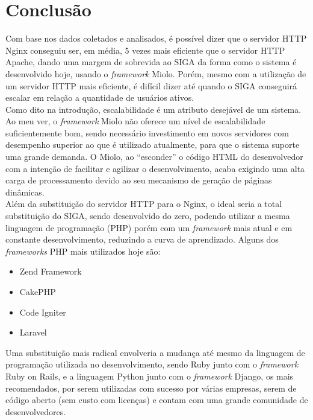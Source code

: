 \chapter{Conclusão}\label{cap:conclusao}
Com base nos dados coletados e analisados, é possível dizer que o servidor HTTP 
Nginx conseguiu ser, em média, 5 vezes mais eficiente que o servidor HTTP 
Apache, dando uma margem de sobrevida ao SIGA da forma como o sistema é 
desenvolvido hoje, usando o \textit{framework} Miolo. Porém, mesmo com a 
utilização de um servidor HTTP mais eficiente, é difícil dizer até quando o 
SIGA conseguirá escalar em relação a quantidade de usuários ativos.\\
Como dito na introdução, escalabilidade é um atributo desejável de um sistema. 
Ao meu ver, o \textit{framework} Miolo não oferece um nível de escalabilidade 
suficientemente bom, sendo necessário investimento em novos servidores com 
desempenho superior ao que é utilizado atualmente, para que o sistema suporte 
uma grande demanda. O Miolo, ao ``esconder'' o código HTML do desenvolvedor com 
a intenção de facilitar e agilizar o desenvolvimento, acaba exigindo uma alta 
carga de processamento devido ao seu mecanismo de geração de páginas 
dinâmicas.\\
Além da substituição do servidor HTTP para o Nginx, o ideal seria a total 
substituição do SIGA, sendo desenvolvido do zero, podendo utilizar a mesma 
linguagem de programação (PHP) porém com um \textit{framework} mais atual e em 
constante desenvolvimento, reduzindo a curva de aprendizado. Alguns dos  
\textit{frameworks} PHP mais utilizados hoje são:
\begin{itemize}
	\item Zend Framework
	\item CakePHP
	\item Code Igniter
	\item Laravel
\end{itemize}
Uma substituição mais radical envolveria a mudança até mesmo da linguagem de 
programação utilizada no desenvolvimento, sendo Ruby junto com o 
\textit{framework} Ruby on Rails, e a linguagem Python junto com o 
\textit{framework} Django, os mais recomendados, por serem utilizadas com 
sucesso por várias empresas, serem de código aberto (sem custo com licenças) e 
contam com uma grande comunidade de desenvolvedores.
